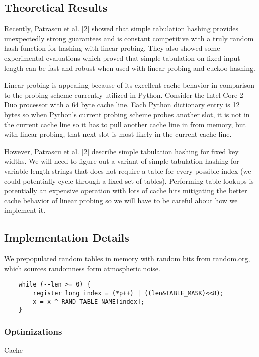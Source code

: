 \documentclass[11pt]{article}
\begin{document}
\subsection{Theoretical Results}
Recently, Patrascu et al. [2] showed that simple tabulation hashing provides unexpectedly strong guarantees and is constant competitive with a truly random hash function for hashing with linear probing. They also showed some experimental evaluations which proved that simple tabulation on fixed input length can be fast and robust when used with linear probing and cuckoo hashing. 

Linear probing is appealing because of its excellent cache behavior in comparison to the probing scheme currently utilized in Python.  Consider the Intel Core 2 Duo processor with a 64 byte cache line.  Each Python dictionary entry is 12 bytes so when Python’s current probing scheme probes another slot, it is not in the current cache line so it has to pull another cache line in from memory, but with linear probing, that next slot is most likely in the current cache line.

However, Patrascu et al. [2] describe simple tabulation hashing for fixed key widths.  We will need to figure out a variant of simple tabulation hashing for variable length strings that does not require a table for every possible index (we could potentially cycle through a fixed set of tables).  Performing table lookups is potentially an expensive operation with lots of cache hits mitigating the better cache behavior of linear probing so we will have to be careful about how we implement it.

\subsection{Implementation Details}
We prepopulated random tables in memory with random bits from random.org, which sources randomness form atmospheric noise.
       
       \begin{verbatim}
    while (--len >= 0) {
        register long index = (*p++) | ((len&TABLE_MASK)<<8);
        x = x ^ RAND_TABLE_NAME[index];
    }
       \end{verbatim}

\subsubsection{Optimizations}

Cache       
\end{document}
